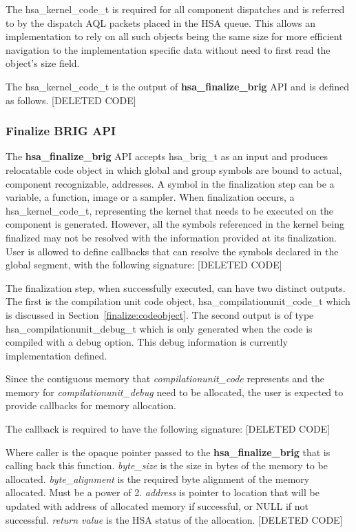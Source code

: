 \documentclass[draft]{book}
\newcommand{\reffun}[1]{\textbf{#1}}
\newcommand{\reftyp}[1]{#1}
\begin{document}
The \reftyp{hsa_kernel_code_t} is required for all component dispatches and
is referred to by the dispatch AQL packets placed in the HSA queue. This allows
an implementation to rely on all such objects being the same size for more
efficient navigation to the implementation specific data without need to first
read the object's size field.

The \reftyp{hsa_kernel_code_t} is the output of
\reffun{hsa_finalize_brig} API and is defined as follows.
[DELETED CODE]

\subsubsection{Finalize BRIG API}
The \reffun{hsa_finalize_brig} API accepts \reftyp{hsa_brig_t} as an input
and produces relocatable code object in which global and group symbols are bound
to actual, component recognizable, addresses. A symbol in the finalization step
can be a variable, a function, image or a sampler. When finalization occurs, a
\reftyp{hsa_kernel_code_t}, representing the kernel that needs to be executed
on the component is generated. However, all the symbols referenced in the
kernel being finalized may not be resolved with the information provided at its
finalization. User is allowed to define callbacks that can resolve the symbols
declared in the global segment, with the following signature:
[DELETED CODE]

The finalization step, when successfully executed, can have two distinct
outputs. The first is the compilation unit code object,
\reftyp{hsa_compilationunit_code_t} which is discussed in
Section~\ref{finalize:codeobject}. The second output is of type
\reftyp{hsa_compilationunit_debug_t} which is only generated when the code is
compiled with a debug option. This debug information is currently implementation
defined.

Since the contiguous memory that {\itshape compilationunit_code} represents and
the memory for {\itshape compilationunit_debug} need to be allocated, the user
is expected to provide callbacks for memory allocation.

The callback is required to have the following signature:
[DELETED CODE]

Where caller is the opaque pointer passed to the \reffun{hsa_finalize_brig}
that is calling back this function. {\itshape byte_size} is the size in bytes
of the memory to be allocated. {\itshape byte_alignment} is the required byte
alignment of the memory allocated. Must be a power of 2. {\itshape address} is
pointer to location that will be updated with address of allocated memory if
successful, or NULL if not successful. {\itshape return value} is the HSA
status of the allocation.
[DELETED CODE]
\end{document}
